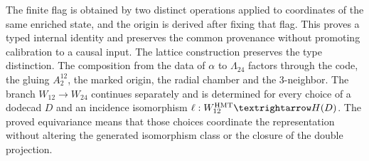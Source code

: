 The finite flag is obtained by two distinct operations applied to
coordinates of the same enriched state, and the origin is derived after
fixing that flag. This proves a typed internal identity and preserves the
common provenance without promoting calibration to a causal input. The
lattice construction preserves the type distinction. The composition from
the data of \(\alpha\) to \(\Lambda_{24}\) factors through the code, the
gluing \(A_2^{12}\), the marked origin, the radial chamber and the 3-neighbor. The
branch \(W_{12}\to W_{24}\) continues separately and is determined for every
choice of a dodecad \(D\) and an incidence isomorphism
\(\ell:W_{12}^{\rm HMT}\to\mathcal H(D)\). The proved equivariance means
that those choices coordinate the representation without altering the generated
isomorphism class or the closure of the double projection.
